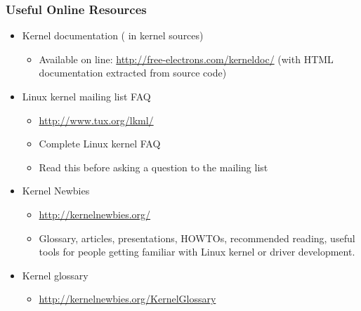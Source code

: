 \begin{frame}
  \frametitle{Useful Online Resources}
  \begin{itemize}
  \item Kernel documentation ( in kernel sources)
    \begin{itemize}
    \item Available on line:
      \url{http://free-electrons.com/kerneldoc/} (with HTML
      documentation extracted from source code)
    \end{itemize}
  \item Linux kernel mailing list FAQ
    \begin{itemize}
    \item \url{http://www.tux.org/lkml/}
    \item Complete Linux kernel FAQ
    \item Read this before asking a question to the mailing list
    \end{itemize}
  \item Kernel Newbies
    \begin{itemize}
    \item \url{http://kernelnewbies.org/}
    \item Glossary, articles, presentations, HOWTOs, recommended
      reading, useful tools for people getting familiar with Linux
      kernel or driver development.
    \end{itemize}
  \item Kernel glossary
    \begin{itemize}
    \item \url{http://kernelnewbies.org/KernelGlossary}
    \end{itemize}
\end{itemize}

\end{frame}

